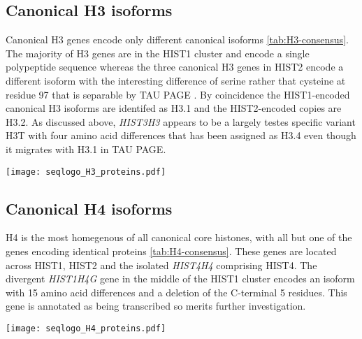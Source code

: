   \subsection{Canonical H3 isoforms}
    Canonical H3 genes encode only \HThreeUniqueProteins{} different canonical isoforms \ref{tab:H3-consensus}.
    The majority of H3 genes are in the HIST1 cluster and encode a single polypeptide sequence \citep{Ederveen2011}
    whereas the three canonical H3 genes in HIST2 encode a different isoform
    with the interesting difference of serine rather that cysteine at residue 97
    that is separable by TAU PAGE \citep{FranklinZweidler1977}.
    By coincidence the HIST1-encoded canonical H3 isoforms are identifed as H3.1 and the HIST2-encoded copies are H3.2.
    As discussed above, \textit{HIST3H3} appears to be a largely testes specific variant H3T
    with four amino acid differences that has been assigned as H3.4 \citep{Talbert2012}
    even though it migrates with H3.1 in TAU PAGE.

    \begin{TableAndFigure*}
      \label{tab:H3-consensus}
      
      \label{fig:H3-weblogo}
      \texttt{[image: seqlogo\_H3\_proteins.pdf]}
    \end{TableAndFigure*}

  \subsection{Canonical H4 isoforms}
    H4 is the most homegenous of all canonical core histones,
    with all but one of the \HFourCodingGenes{} genes encoding identical proteins \ref{tab:H4-consensus}.
    These genes are located across HIST1, HIST2 and the isolated \textit{HIST4H4} comprising HIST4.
    The divergent \textit{HIST1H4G} gene in the middle of the HIST1 cluster
    encodes an isoform with 15 amino acid differences and a deletion of the C-terminal 5 residues.
    This gene is annotated as being transcribed so merits further investigation.

    \begin{TableAndFigure*}
      \label{tab:H4-consensus}
      
      \label{fig:H4-weblogo}
      \texttt{[image: seqlogo\_H4\_proteins.pdf]}
    \end{TableAndFigure*}

